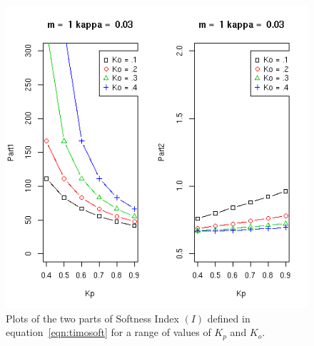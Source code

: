 %

\begin{figure}[!h]
  \centering
  \includegraphics[width=1.1\textwidth]{softparts.png}
  \caption{Plots of the two parts of Softness Index $(I)$ defined in equation~\ref{eqn:timosoft} for a range of values of $K_{p}$ and $K_{o}$.}
  \label{fig:softparts}
\end{figure}

%

